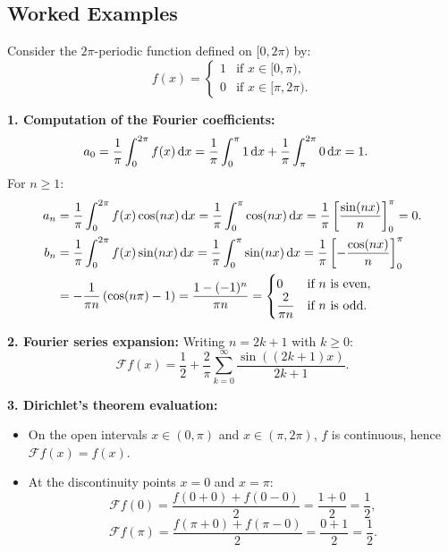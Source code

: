 \subsection{Worked Examples}

\begin{exemple}
Consider the $2\pi$-periodic function defined on $[0, 2\pi)$ by:
\[
f(x) = \begin{cases} 1 & \text{if } x \in [0, \pi), \\ 0 & \text{if } x \in [\pi, 2\pi). \end{cases}
\]

\textbf{1. Computation of the Fourier coefficients:}
\begin{align*}
a_0 &= \frac{1}{\pi} \int_0^{2\pi} f(x) \,\mathrm{d}x = \frac{1}{\pi} \int_0^\pi 1 \,\mathrm{d}x + \frac{1}{\pi} \int_\pi^{2\pi} 0 \,\mathrm{d}x = 1.
\end{align*}
For $n \ge 1$:
\begin{align*}
a_n &= \frac{1}{\pi} \int_0^{2\pi} f(x) \cos(nx) \,\mathrm{d}x = \frac{1}{\pi} \int_0^\pi \cos(nx) \,\mathrm{d}x = \frac{1}{\pi} \left[ \frac{\sin(nx)}{n} \right]_0^\pi = 0. \\
b_n &= \frac{1}{\pi} \int_0^{2\pi} f(x) \sin(nx) \,\mathrm{d}x = \frac{1}{\pi} \int_0^\pi \sin(nx) \,\mathrm{d}x = \frac{1}{\pi} \left[ -\frac{\cos(nx)}{n} \right]_0^\pi \\
    &= -\frac{1}{\pi n} \left( \cos(n\pi) - 1 \right) = \frac{1 - (-1)^n}{\pi n} = \begin{cases} 0 & \text{if } n \text{ is even}, \\ \dfrac{2}{\pi n} & \text{if } n \text{ is odd}. \end{cases}
\end{align*}

\textbf{2. Fourier series expansion:}
Writing $n = 2k + 1$ with $k \ge 0$:
\[
\mathcal{F}f(x) = \frac{1}{2} + \frac{2}{\pi} \sum_{k=0}^\infty \frac{\sin((2k+1)x)}{2k+1}.
\]

\textbf{3. Dirichlet's theorem evaluation:}
\begin{itemize}
    \item On the open intervals $x \in (0, \pi)$ and $x \in (\pi, 2\pi)$, $f$ is continuous, hence $\mathcal{F}f(x) = f(x)$.
    \item At the discontinuity points $x = 0$ and $x = \pi$:
    \[
    \mathcal{F}f(0) = \frac{f(0+0) + f(0-0)}{2} = \frac{1 + 0}{2} = \frac{1}{2},
    \]
    \[
    \mathcal{F}f(\pi) = \frac{f(\pi+0) + f(\pi-0)}{2} = \frac{0 + 1}{2} = \frac{1}{2}.
    \]
\end{itemize}
\end{exemple}

